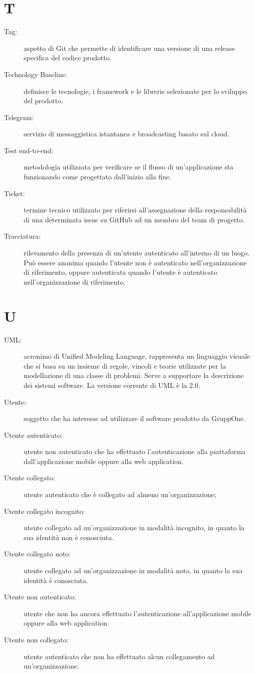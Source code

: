 \documentclass{article}
\begin{document}
	\section{T}
	\begin{description}
		\item[Tag:] aspetto di Git che permette di identificare una versione di una release specifica del codice prodotto.
		\item[Technology Baseline:] definisce le tecnologie, i framework e le librerie selezionate per lo sviluppo del prodotto.
		\item[Telegram:] servizio di messaggistica istantanea e broadcasting basato sul cloud.
		\item[Test end-to-end:] metodologia utilizzata per verificare se il flusso di un'applicazione sta funzionando come progettato dall'inizio alla fine.
		\item[Ticket:] termine tecnico utilizzato per riferirsi all'assegnazione della responsabilità di una determinata issue su GitHub ad un membro del team di progetto.
		\item[Tracciatura:] rilevamento della presenza di un'utente autenticato all'interno di un luogo. Può essere anonima quando l'utente non è autenticato nell'organizzazione di riferimento, oppure autenticata quando l'utente è autenticato nell'organizzazione di riferimento.
	\end{description}
	\newpage
	\section{U}
	\begin{description}
		\item[UML:] acronimo di Unified Modeling Language, rappresenta un linguaggio visuale che si basa su un insieme di regole, vincoli e teorie utilizzate per la modellazione di una classe di problemi. Serve a supportare la descrizione dei sistemi software. La versione corrente di UML è la 2.0.
		\item[Utente:] soggetto che ha interesse ad utilizzare il software prodotto da GruppOne.
		\item[Utente autenticato:] utente non autenticato che ha effettuato l'autenticazione alla piattaforma dall'applicazione mobile oppure alla web application.
		\item[Utente collegato:] utente autenticato che è collegato ad almeno un'organizzazione;
		\item[Utente collegato incognito:] utente collegato ad un'organizzazione in modalità incognito, in quanto la sua identità non è conosciuta.
		\item[Utente collegato noto:] utente collegato ad un'organizzazione in modalità noto, in quanto la sua identità è conosciuta.
		\item[Utente non autenticato:] utente che non ha ancora effettuato l'autenticazione all'applicazione mobile oppure alla web application.
		\item[Utente non collegato:] utente autenticato che non ha effettuato alcun collegamento ad un'organizzazione.
	\end{description}
	\newpage
\end{document}
